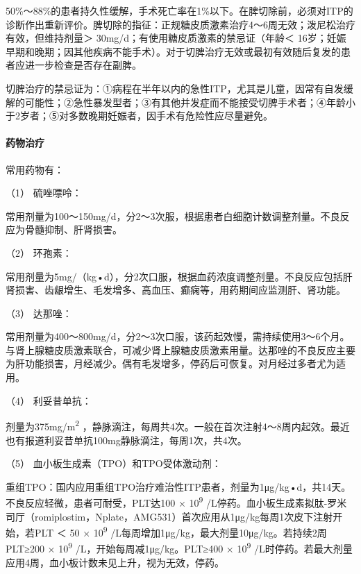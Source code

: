 50\%～88\%的患者持久性缓解，手术死亡率在1\%以下。在脾切除前，必须对ITP的诊断作出重新评价。脾切除的指征：正规糖皮质激素治疗4～6周无效；泼尼松治疗有效，但维持剂量＞
30mg/d；有使用糖皮质激素的禁忌证（年龄＜
16岁；妊娠早期和晚期；因其他疾病不能手术）。对于切脾治疗无效或最初有效随后复发的患者应进一步检查是否存在副脾。

切脾治疗的禁忌证为：①病程在半年以内的急性ITP，尤其是儿童，因常有自发缓解的可能性；②急性暴发型者；③有其他并发症而不能接受切脾手术者；④年龄小于2岁者；⑤对多数晚期妊娠者，因手术有危险性应尽量避免。

\paragraph{药物治疗}

常用药物有：

\hypertarget{text00331.htmlux5cux23CHP12-1-1-3-3-2-1}{}
（1） 硫唑嘌呤：

常用剂量为100～150mg/d，分2～3次服，根据患者白细胞计数调整剂量。不良反应为骨髓抑制、肝肾损害。

\hypertarget{text00331.htmlux5cux23CHP12-1-1-3-3-2-2}{}
（2） 环孢素：

常用剂量为5mg/（kg•d），分2次口服，根据血药浓度调整剂量。不良反应包括肝肾损害、齿龈增生、毛发增多、高血压、癫痫等，用药期间应监测肝、肾功能。

\hypertarget{text00331.htmlux5cux23CHP12-1-1-3-3-2-3}{}
（3） 达那唑：

常用剂量为400～800mg/d，分2～3次口服，该药起效慢，需持续使用3～6个月。与肾上腺糖皮质激素联合，可减少肾上腺糖皮质激素用量。达那唑的不良反应主要为肝功能损害，月经减少。偶有毛发增多，停药后可恢复。对月经过多者尤为适用。

\hypertarget{text00331.htmlux5cux23CHP12-1-1-3-3-2-4}{}
（4） 利妥昔单抗：

剂量为375mg/m\textsuperscript{2}
，静脉滴注，每周共4次。一般在首次注射4～8周内起效。最近也有报道利妥昔单抗100mg静脉滴注，每周1次，共4次。

\hypertarget{text00331.htmlux5cux23CHP12-1-1-3-3-2-5}{}
（5） 血小板生成素（TPO）和TPO受体激动剂：

重组TPO：国内应用重组TPO治疗难治性ITP患者，剂量为1μg/kg•d，共14天。不良反应轻微，患者可耐受，PLT达100
× 10\textsuperscript{9}
/L停药。血小板生成素拟肽-罗米司厅（romiplostim，Nplate，AMG531）首次应用从1μg/kg每周1次皮下注射开始，若PLT
＜ 50 × 10\textsuperscript{9}
/L每周增加1μg/kg，最大剂量10μg/kg。若持续2周PLT≥200 ×
10\textsuperscript{9} /L，开始每周减1μg/kg。PLT≥400 ×
10\textsuperscript{9}
/L时停药。若最大剂量应用4周，血小板计数未见上升，视为无效，停药。

